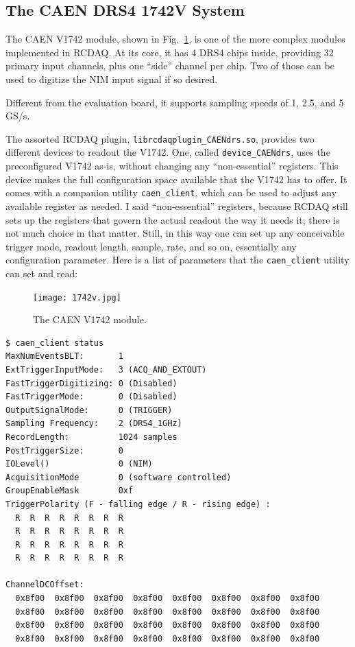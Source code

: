 \documentclass{article}[11pt]
\begin{document}
\subsection{The CAEN DRS4 1742V System}


The CAEN V1742 module, shown in Fig.~\ref{caen1742v}, is one of the
more complex modules implemented in RCDAQ. At its core, it has 4 DRS4
chips inside, providing 32 primary input channels, plus one ``side''
channel per chip. Two of those can be used to digitize the NIM input
signal if so desired.

Different from the evaluation board, it supports sampling speeds of 1,
2.5, and 5\,GS/s.


The assorted RCDAQ plugin, \verb|librcdaqplugin_CAENdrs.so|, provides
two different devices to readout the V1742. One, called
\verb|device_CAENdrs|, uses the preconfigured V1742 as-is, without
changing any ``non-essential'' registers. This device makes the full
configuration space available that the V1742 has to offer. It comes
with a companion utility \verb|caen_client|, which can be used to
adjust any available register as needed. I said ``non-essential''
registers, because RCDAQ still sets up the registers that govern the
actual readout the way it needs it; there is not much choice in that
matter. Still, in this way one can set up any conceivable trigger
mode, readout length, sample, rate, and so on, essentially any
configuration parameter. Here is a list of parameters that the
\verb|caen_client| utility can set and read:

\begin{figure}
  \centering
  \texttt{[image: 1742v.jpg]}
  \caption{\label{caen1742v}The CAEN V1742 module.}
\end{figure}


\begin{verbatim}
$ caen_client status
MaxNumEventsBLT:       1
ExtTriggerInputMode:   3 (ACQ_AND_EXTOUT)
FastTriggerDigitizing: 0 (Disabled)
FastTriggerMode:       0 (Disabled)
OutputSignalMode:      0 (TRIGGER)
Sampling Frequency:    2 (DRS4_1GHz)
RecordLength:          1024 samples
PostTriggerSize:       0
IOLevel()              0 (NIM)
AcquisitionMode        0 (software controlled)
GroupEnableMask        0xf
TriggerPolarity (F - falling edge / R - rising edge) :
  R  R  R  R  R  R  R  R
  R  R  R  R  R  R  R  R
  R  R  R  R  R  R  R  R
  R  R  R  R  R  R  R  R

ChannelDCOffset:
  0x8f00  0x8f00  0x8f00  0x8f00  0x8f00  0x8f00  0x8f00  0x8f00
  0x8f00  0x8f00  0x8f00  0x8f00  0x8f00  0x8f00  0x8f00  0x8f00
  0x8f00  0x8f00  0x8f00  0x8f00  0x8f00  0x8f00  0x8f00  0x8f00
  0x8f00  0x8f00  0x8f00  0x8f00  0x8f00  0x8f00  0x8f00  0x8f00
\end{verbatim}
\end{document}
